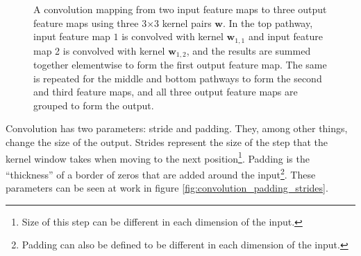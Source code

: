 \begin{figure}[ht]
    \caption[2D convolution with multiple channels and kernels]{\label{fig:convolution_kernel_collection} A convolution mapping from two input feature maps to three output feature maps using three 3×3 kernel pairs $\mathbf{w}$. In the top pathway, input feature map $1$ is convolved with kernel $\mathbf{w}_{1,1}$ and input feature map 2 is convolved with kernel $\mathbf{w}_{1,2}$, and the results are summed together elementwise to form the first output feature map. The same is repeated for the middle and bottom pathways to form the second and third feature maps, and all three output feature maps are grouped to form the output.\cite{convolutionguide}}
\end{figure}

Convolution has two parameters: stride and padding. They, among other things, change the size of the output. Strides represent the size of the step that the kernel window takes when moving to the next position\footnote{Size of this step can be different in each dimension of the input.}. Padding is the ``thickness'' of a border of zeros that are added around the input\footnote{Padding can also be defined to be different in each dimension of the input.}. These parameters can be seen at work in figure \ref{fig:convolution_padding_strides}.

